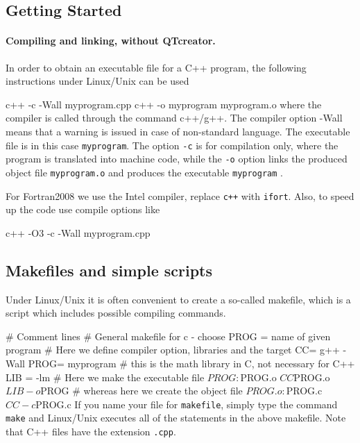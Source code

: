 \documentclass[%
oneside,                 %
final,                   %
10pt]{article}
\begin{document}
\noindent



\subsection{Getting Started}


\paragraph{Compiling and linking, without QTcreator.}
In order to obtain an executable file for a C++ program, the following
instructions under Linux/Unix can be used

\bsys
c++ -c -Wall myprogram.cpp
c++ -o myprogram myprogram.o
\esys
where the compiler is called through the command c++/g++. The compiler
option -Wall means that a warning is issued in case of non-standard
language. The executable file is in this case \Verb!myprogram!. The option
\Verb!-c! is for compilation only, where the program is translated into machine code,
while the \Verb!-o! option links the produced object file \Verb!myprogram.o!
and produces the executable \Verb!myprogram! .

For Fortran2008 we use the Intel compiler, replace \Verb!c++! with \Verb!ifort!.
Also, to speed up the code use compile options like

\bsys
c++ -O3 -c -Wall myprogram.cpp
\esys



\subsection{Makefiles and simple scripts}

Under Linux/Unix it is often convenient to create a
so-called makefile, which is a script which includes possible
compiling commands.

\bcppcod
# Comment lines
# General makefile for c - choose PROG =   name of given program
# Here we define compiler option, libraries and the  target
CC= g++ -Wall
PROG= myprogram
# this is the math library in C, not necessary for C++
LIB = -lm
# Here we make the executable file
${PROG} :          ${PROG}.o
                   ${CC} ${PROG}.o ${LIB} -o ${PROG}
# whereas here we create the object file
${PROG}.o :       ${PROG}.c
                  ${CC} -c ${PROG}.c
\ecppcod
If you name your file for \Verb!makefile!, simply type the command
\Verb!make! and Linux/Unix executes all of the statements in the above
makefile. Note that C++ files have the extension \Verb!.cpp!.
\end{document}
